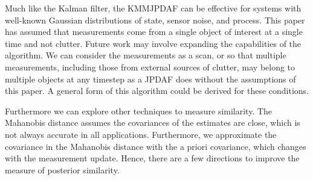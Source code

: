 \documentclass[letterpaper, 10pt, conference]{ieeeconf}
\begin{document}
Much like the Kalman filter, the KMMJPDAF can be effective for systems with well-known Gaussian distributions of state, sensor noise, and process. This paper has assumed that measurements come from a single object of interest at a single time and not clutter. Future work may involve expanding the capabilities of the algorithm. We can consider the measurements as a scan, or so that multiple measurements, including those from external sources of clutter, may belong to multiple objects at any timestep as a JPDAF does without the assumptions of this paper. A general form of this algorithm could be derived for these conditions.

Furthermore we can explore other techniques to measure similarity. The Mahanobis distance assumes the covariances of the estimates are close, which is not always accurate in all applications. Furthermore, we approximate the covariance in the Mahanobis distance with the a priori covariance, which changes with the measurement update. Hence, there are a few directions to improve the measure of posterior similarity.




\end{document}
